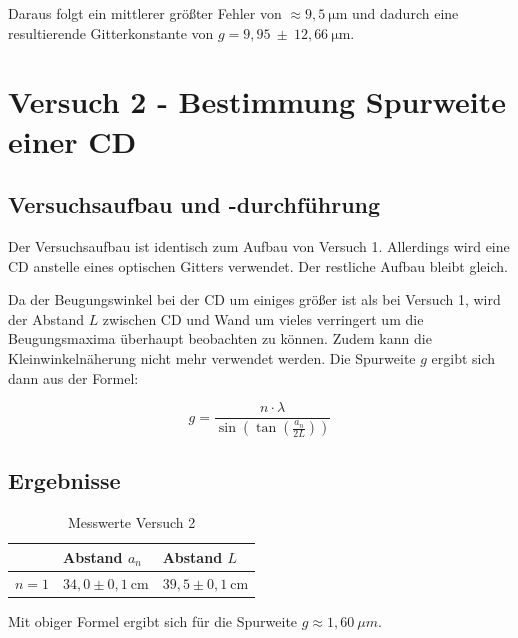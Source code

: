         Daraus folgt ein mittlerer größter Fehler von $\approx 9,5\ \mathrm{\mu m}$ und dadurch eine resultierende Gitterkonstante von $g = 9,95\ \pm\ 12,66 \ \mathrm{\mu m}$.

      

\section{Versuch 2 - Bestimmung Spurweite einer CD}
    
    \subsection{Versuchsaufbau und -durchführung}
        
        Der Versuchsaufbau ist identisch zum Aufbau von Versuch 1. Allerdings wird eine CD anstelle eines optischen Gitters verwendet. Der restliche Aufbau bleibt gleich.

        Da der Beugungswinkel bei der CD um einiges größer ist als bei Versuch 1, wird der Abstand $L$ zwischen CD und Wand um vieles verringert um die Beugungsmaxima überhaupt beobachten zu können. Zudem kann die Kleinwinkelnäherung nicht mehr verwendet werden. Die Spurweite $g$ ergibt sich dann aus der Formel:

        \begin{equation}
            g = \frac{n \cdot \lambda}{\sin(\tan(\frac{a_{n}}{2 L}))}
        \end{equation}

    \subsection{Ergebnisse}
        
        \begin{table}[H]
            \centering
            \caption{Messwerte Versuch 2}
            \vspace*{1em}
            \begin{tabular}{|l|l|l|}
                \hline
                & Abstand $a_{n}$ & Abstand $L$\\
                \hline
                $n = 1$ & $34,0 \pm 0,1\ \mathrm{cm}$ & $39,5 \pm 0,1\ \mathrm{cm}$\\
                \hline
            \end{tabular}
        \end{table}

        Mit obiger Formel ergibt sich für die Spurweite $g \approx 1,60\ \mu m$.

